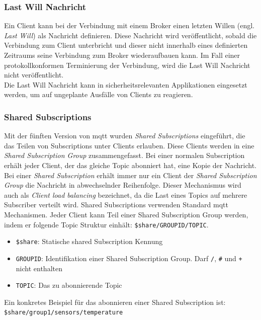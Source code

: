 \subsubsection{Last Will Nachricht} \label{s:last-will}
Ein Client kann bei der Verbindung mit einem Broker einen letzten Willen (engl. \textit{Last Will}) als Nachricht definieren. Diese Nachricht wird veröffentlicht, sobald die Verbindung zum Client unterbricht und dieser nicht innerhalb eines definierten Zeitraums seine Verbindung zum Broker wiederaufbauen kann.
Im Fall einer protokollkonformen Terminierung der Verbindung, wird die Last Will Nachricht nicht veröffentlicht.
\cite{soniSURVEYMQTTPROTOCOL}\\
Die Last Will Nachricht kann in sicherheitsrelevanten Applikationen eingesetzt werden, um auf ungeplante Ausfälle von Clients zu reagieren.

\subsubsection{Shared Subscriptions} \label{s:shared-subsriptions}
Mit der fünften Version von \ac{mqtt} wurden \textit{Shared Subscriptions} eingeführt, die das Teilen von Subscriptions unter Clients erlauben. Diese Clients werden in eine \textit{Shared Subscription Group} zusammengefasst. Bei einer normalen Subscription erhält jeder Client, der das gleiche Topic abonniert hat, eine Kopie der Nachricht. Bei einer \textit{Shared Subscription} erhält immer nur ein Client der \textit{Shared Subscription Group} die Nachricht in abwechselnder Reihenfolge. Dieser Mechanismus wird auch als \textit{Client load balancing} bezeichnet, da die Last eines Topics auf mehrere Subscriber verteilt wird.\cite{raschbichlerMQTTHowNew}
Shared Subscriptions verwenden Standard \ac{mqtt} Mechanismen. Jeder Client kann Teil einer Shared Subscription Group werden, indem er folgende Topic Struktur einhält: \verb|$share/GROUPID/TOPIC|.
\begin{itemize}
    \item \verb|$share|: Statische shared Subscription Kennung
    \item \verb|GROUPID|: Identifikation einer Shared Subscription Group. Darf \verb|/|, \verb|#| und \verb|+| nicht enthalten
    \item \verb|TOPIC|: Das zu abonnierende Topic
\end{itemize}
Ein konkretes Beispiel für das abonnieren einer Shared Subscription ist:
\newline
\verb|$share/group1/sensors/temperature|

